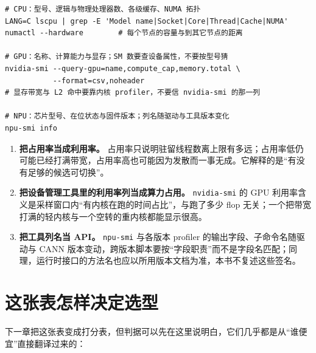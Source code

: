 \documentclass[12pt,a4paper,fontset=fandol]{ctexbook}
\newcommand{\Tp}[1]{\texttt{#1}}
\begin{document}
\begin{lstlisting}[style=shellstyle,caption={三个执行域的最小读数入口}]
# CPU：型号、逻辑与物理处理器数、各级缓存、NUMA 拓扑
LANG=C lscpu | grep -E 'Model name|Socket|Core|Thread|Cache|NUMA'
numactl --hardware        # 每个节点的容量与到其它节点的距离

# GPU：名称、计算能力与显存；SM 数要查设备属性，不要按型号猜
nvidia-smi --query-gpu=name,compute_cap,memory.total \
           --format=csv,noheader
# 显存带宽与 L2 命中要靠内核 profiler，不要信 nvidia-smi 的那一列

# NPU：芯片型号、在位状态与固件版本；列名随驱动与工具版本变化
npu-smi info
\end{lstlisting}

\begin{warning}[title={三处最容易被误读的读数}]
\begin{enumerate}
\item \textbf{把占用率当成利用率。} 占用率只说明驻留线程数离上限有多远；占用率低仍可能已经打满带宽，占用率高也可能因为发散而一事无成。它解释的是``有没有足够的候选可切换''。
\item \textbf{把设备管理工具里的利用率列当成算力占用。} \Tp{nvidia-smi} 的 GPU 利用率含义是采样窗口内``有内核在跑的时间占比''，与跑了多少 flop 无关；一个把带宽打满的轻内核与一个空转的重内核都能显示很高。
\item \textbf{把工具列名当 API。} \Tp{npu-smi} 与各版本 profiler 的输出字段、子命令名随驱动与 CANN 版本变动，跨版本脚本要按``字段职责''而不是字段名匹配；同理，运行时接口的方法名也应以所用版本文档为准，本书不复述这些签名。
\end{enumerate}
\end{warning}

\section{这张表怎样决定选型}

下一章把这张表变成打分表，但判据可以先在这里说明白，它们几乎都是从``谁便宜''直接翻译过来的：
\end{document}
